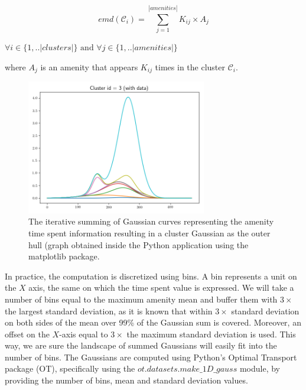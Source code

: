 	\begin{equation}
	emd(\mathcal{C}_i) = \sum_{j=1}^{|amenities|} K_{ij} \times A_j
	\end{equation}
	
	$\forall i \in \{1,..|clusters|\} \text{ and } \forall j \in \{1,..|amenities|\}$
	
	where $A_j$ is an amenity that appears $K_{ij}$ times in the cluster $\mathcal{C}_i$. \\
	
	\begin{figure}[!ht]
		\centering
		\includegraphics[width=0.7\textwidth]{graphics/emd_gaussian_addition3.png}
		\caption{The iterative summing of Gaussian curves representing the amenity time spent information resulting in a cluster Gaussian as the outer hull (graph obtained inside the Python application using the matplotlib package.}
		\label{fig:gaussian}
	\end{figure}
	
	
	In practice, the computation is discretized using bins. A bin represents a unit on the $X$ axis, the same on which the time spent value is expressed. We will take a number of bins equal to the maximum amenity mean and buffer them with $3\times$ the largest standard deviation, as it is known that within $3\times$ standard deviation on both sides of the mean over 99\% of the Gaussian sum is covered. Moreover, an offset on the $X$-axis equal to $3\times$ the maximum standard deviation is used. This way, we are sure the landscape of summed Gaussians will easily fit into the number of bins. The Gaussians are computed using Python's Optimal Transport package (OT), specifically using the $ot.datasets.make\_1D\_gauss$ module, by providing the number of bins, mean and standard deviation values.
	
